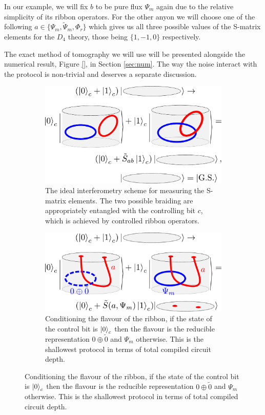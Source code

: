 \documentclass[two column]{article}
\begin{document}
In our example, we will fix $b$ to be pure flux $\Psi_m$ again due to the relative simplicity of its ribbon operators. For the other anyon we will choose one of the following $a\in\{\Psi_m,\tilde{\Psi}_m, \Phi_r \}$ which gives us all three possible values of the S-matrix elements for the $D_4$ theory, those being $\{1, -1, 0\}$ respectively.

The exact method of tomography we will use will be presented alongside the numerical result, Figure \ref{}, in Section \ref{sec:num}. The way the noise interact with the protocol is non-trivial and deserves a separate discussion.

\begin{figure}
\centering

\begin{subfigure}{0.47\textwidth}
    \includegraphics[width = \linewidth]{Figures/intef_example.pdf}
    \caption{The ideal interferometry scheme for measuring the S-matrix elements. The two possible braiding are appropriately entangled with the controlling bit $c$, which is achieved by controlled ribbon operators.}
    \label{fig:intef_example}
\end{subfigure}\hfill
\begin{subfigure}{0.47\textwidth}
    \includegraphics[width=\linewidth]{Figures/intefFlav.pdf}
    \caption{Conditioning the flavour of the ribbon, if the state of the control bit is $\ket{0}_c$ then the flavour is the reducible representation $0\oplus\tilde{0}$ and $\Psi_m$ otherwise. This is the shallowest protocol in terms of total compiled circuit depth.}
    \label{fig:cond_flav}
\end{subfigure}
\vspace{15pt}


\end{figure}
\end{document}
